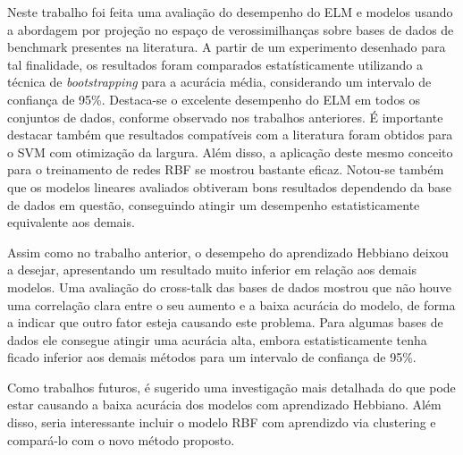 \documentclass[conference]{IEEEtran}
\begin{document}
	Neste trabalho foi feita uma avaliação do desempenho do ELM e modelos usando a abordagem por projeção no espaço de verossimilhanças sobre bases de dados de benchmark presentes na literatura. A partir de um experimento desenhado para tal finalidade, os resultados foram comparados estatísticamente utilizando a técnica de \textit{bootstrapping} para a acurácia média, considerando um intervalo de confiança de 95\%. Destaca-se o excelente desempenho do ELM em todos os conjuntos de dados, conforme observado nos trabalhos anteriores. É importante destacar também que resultados compatíveis com a literatura foram obtidos para o SVM com otimização da largura. Além disso, a aplicação deste mesmo conceito para o treinamento de redes RBF se mostrou bastante eficaz. Notou-se também que os modelos lineares avaliados obtiveram bons resultados dependendo da base de dados em questão, conseguindo atingir um desempenho estatisticamente equivalente aos demais.
	
	Assim como no trabalho anterior, o desempeho do aprendizado Hebbiano deixou a desejar, apresentando um resultado muito inferior em relação aos demais modelos. Uma avaliação do cross-talk das bases de dados mostrou que não houve uma correlação clara entre o seu aumento e a baixa acurácia do modelo, de forma a indicar que outro fator esteja causando este problema. Para algumas bases de dados ele consegue atingir uma acurácia alta, embora estatisticamente tenha ficado inferior aos demais métodos para um intervalo de confiança de 95\%.
	
	Como trabalhos futuros, é sugerido uma investigação mais detalhada do que pode estar causando a baixa acurácia dos modelos com aprendizado Hebbiano. Além disso, seria interessante incluir o modelo RBF com aprendizdo via clustering e compará-lo com o novo método proposto. 
		


    
	
	
\end{document}
